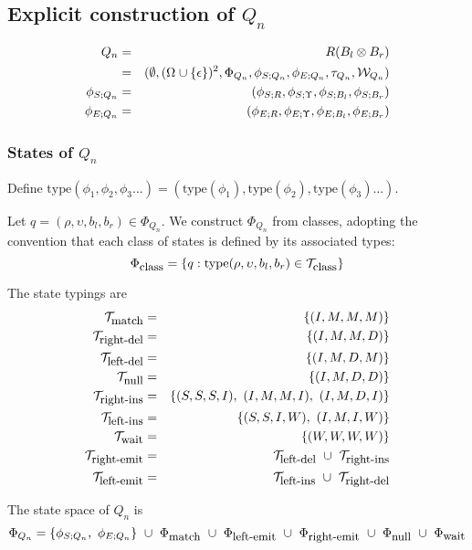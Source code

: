 \documentclass{article}
\newcommand{\seclabel}[1]{\label{sec.#1}}
\newcommand\gappedalphabet[1]{(\Omega_{#1} \cup \{\epsilon\})}
\newcommand\gapsquared{\gappedalphabet{}^2}
\newcommand\compose{}
\newcommand\fork{\otimes}
\newcommand\idfork{\Upsilon}
\newcommand\States{\Phi}
\newcommand\statesof[1]{\States_{#1}}
\newcommand\Transitions{\tau}
\newcommand\transitionsof[1]{\Transitions_{#1}}
\newcommand\startstateof[1]{\phi_{S;#1}}
\newcommand\laststateof[1]{\phi_{E;#1}}
\newcommand\weight{{\cal W}}
\newcommand\weightfunof[1]{\weight_{#1}}
\newcommand\statetype{\mbox{type}}
\newcommand\typeset[1]{{\cal T}_{\mbox{\small #1}}}
\newcommand\stateset[1]{\statesof{\mbox{\small #1}}}
\newcommand\qstate{(\rho,\upsilon,b_l,b_r)}
\newcommand\matchsuffix{match}
\newcommand\nullsuffix{null}
\newcommand\leftinsertsuffix{left-ins}
\newcommand\rightinsertsuffix{right-ins}
\newcommand\leftdeletesuffix{left-del}
\newcommand\rightdeletesuffix{right-del}
\newcommand\leftemitsuffix{left-emit}
\newcommand\rightemitsuffix{right-emit}
\newcommand\qwaitsuffix{wait}
\newcommand\matchstates{\stateset{\matchsuffix}}
\newcommand\nullstates{\stateset{\nullsuffix}}
\newcommand\leftemitstates{\stateset{\leftemitsuffix}}
\newcommand\rightemitstates{\stateset{\rightemitsuffix}}
\newcommand\qwaitstates{\stateset{\qwaitsuffix}}
\newcommand\matchtypes{\typeset{\matchsuffix}}
\newcommand\nulltypes{\typeset{\nullsuffix}}
\newcommand\leftinserttypes{\typeset{\leftinsertsuffix}}
\newcommand\rightinserttypes{\typeset{\rightinsertsuffix}}
\newcommand\leftdeletetypes{\typeset{\leftdeletesuffix}}
\newcommand\rightdeletetypes{\typeset{\rightdeletesuffix}}
\newcommand\leftemittypes{\typeset{\leftemitsuffix}}
\newcommand\rightemittypes{\typeset{\rightemitsuffix}}
\newcommand\qwaittypes{\typeset{\qwaitsuffix}}
\begin{document}
\subsection{Explicit construction of $Q_n$}
\seclabel{Qn}
\begin{eqnarray*}
Q_n & = & R \compose (B_l \fork B_r) \\
& = & (\emptyset,\gapsquared,\statesof{Q_n},\startstateof{Q_n},\laststateof{Q_n},\transitionsof{Q_n},\weightfunof{Q_n}) \\
\startstateof{Q_n} & = & (\startstateof{R},\startstateof{\idfork},\startstateof{B_l},\startstateof{B_r}) \\
\laststateof{Q_n} & = & (\laststateof{R},\laststateof{\idfork},\laststateof{B_l},\laststateof{B_r})
\end{eqnarray*}

\subsubsection{States of $Q_n$}

Define $\statetype(\phi_1,\phi_2,\phi_3 \ldots) = (\statetype(\phi_1), \statetype(\phi_2), \statetype(\phi_3) \ldots)$.

Let $q=\qstate\in\statesof{Q_n}$.
We construct $\statesof{Q_n}$ from classes, adopting the convention that each class of states is defined by its associated types:
\[
\stateset{class} = \{ q: \statetype\qstate \in \typeset{class} \}
\]

The state typings are
\begin{eqnarray*}
\matchtypes & = & \{ (I,M,M,M) \}  \\
\rightdeletetypes & = & \{ (I,M,M,D) \}  \\
\leftdeletetypes & = & \{ (I,M,D,M) \}  \\
\nulltypes & = & \{ (I,M,D,D) \}  \\
\rightinserttypes & = & \{ (S,S,S,I),\ (I,M,M,I),\ (I,M,D,I) \}  \\
\leftinserttypes & = & \{ (S,S,I,W),\ (I,M,I,W) \}  \\
\qwaittypes & = & \{ (W,W,W,W) \} \\
\rightemittypes & = & \leftdeletetypes\ \cup\ \rightinserttypes \\
\leftemittypes & = & \leftinserttypes\ \cup\ \rightdeletetypes
\end{eqnarray*}

The state space of $Q_n$ is
\[
\statesof{Q_n} = \{ \startstateof{Q_n},\ \laststateof{Q_n} \}\ \cup\ \matchstates\ \cup\ \leftemitstates\ \cup\ \rightemitstates\ \cup\ \nullstates\ \cup\ \qwaitstates
\]
\end{document}
